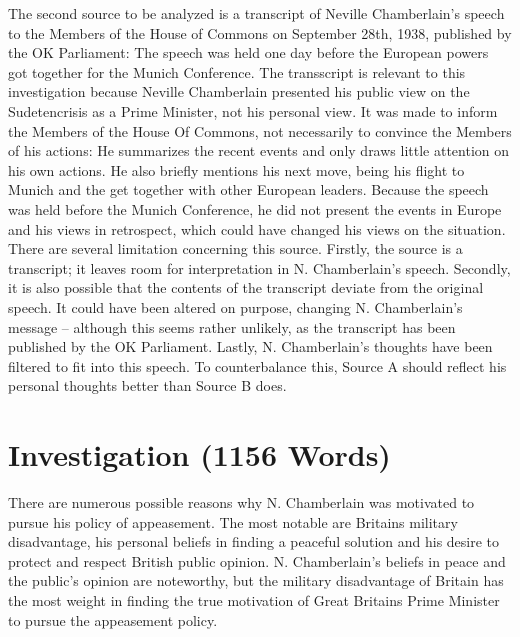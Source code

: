 \documentclass[10pt, a4papert, hidelinks]{article}
\begin{document}
The second source to be analyzed is a transcript of Neville Chamberlain's speech to the Members of the House of Commons on September 28th, 1938, published by the OK Parliament: The speech was held one day before the European powers got together for the Munich Conference.
The transscript is relevant to this investigation because Neville Chamberlain presented his public view on the Sudetencrisis as a Prime Minister, not his personal view. It was made to inform the Members of the House Of Commons, not necessarily to convince the Members of his actions: He summarizes the recent events and only draws little attention on his own actions. He also briefly mentions his next move, being his flight to Munich and the get together with other European leaders.
Because the speech was held before the Munich Conference, he did not present the events in Europe and his views in retrospect, which could have changed his views on the situation.
There are several limitation concerning this source.
Firstly, the source is a transcript; it leaves room for interpretation in N. Chamberlain's speech. Secondly, it is also possible that the contents of the transcript deviate from the original speech. It could have been altered on purpose, changing N. Chamberlain's message -- although this seems rather unlikely, as the transcript has been published by the OK Parliament. Lastly, N. Chamberlain's thoughts have been filtered to fit into this speech. To counterbalance this, Source A should reflect his personal thoughts better than Source B does.
\cite{prime_minister_statement_common_sittings_european_situation}

\section{Investigation (1156 Words)} %


There are numerous possible reasons why N. Chamberlain was motivated to pursue his policy of appeasement. The most notable are Britains military disadvantage, his personal beliefs in finding a peaceful solution and his desire to protect and respect British public opinion. N. Chamberlain's beliefs in peace and the public's opinion are noteworthy, but the military disadvantage of Britain has the most weight in finding the true motivation of Great Britains Prime Minister to pursue the appeasement policy.
\end{document}
